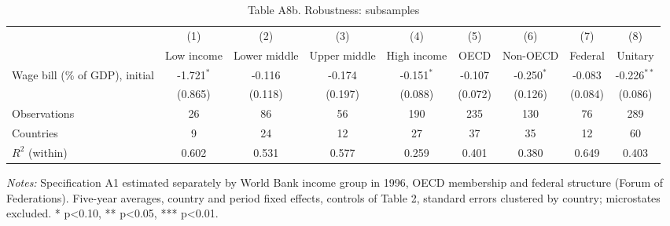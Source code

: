 \begin{table}[htbp]\centering\footnotesize
\providecommand{\sym}[1]{\ensuremath{^{#1}}}
\caption{Table A8b. Robustness: subsamples}\label{tab:TableA8b_robustness_subsamples}
\begin{tabular}{l*{8}{c}}
\toprule
 & (1) & (2) & (3) & (4) & (5) & (6) & (7) & (8) \\
 & Low income & Lower middle & Upper middle & High income & OECD & Non-OECD & Federal & Unitary \\
\midrule
Wage bill (\% of GDP), initial & -1.721\sym{*} & -0.116 & -0.174 & -0.151\sym{*} & -0.107 & -0.250\sym{*} & -0.083 & -0.226\sym{**} \\
 & (0.865) & (0.118) & (0.197) & (0.088) & (0.072) & (0.126) & (0.084) & (0.086) \\
\midrule
Observations & 26 & 86 & 56 & 190 & 235 & 130 & 76 & 289 \\
Countries & 9 & 24 & 12 & 27 & 37 & 35 & 12 & 60 \\
$R^2$ (within) & 0.602 & 0.531 & 0.577 & 0.259 & 0.401 & 0.380 & 0.649 & 0.403 \\
\bottomrule
\end{tabular}
\begin{minipage}{0.95\linewidth}\vspace{4pt}\scriptsize \textit{Notes:} Specification A1 estimated separately by World Bank income group in 1996, OECD membership and federal structure (Forum of Federations). Five-year averages, country and period fixed effects, controls of Table 2, standard errors clustered by country; microstates excluded. * p<0.10, ** p<0.05, *** p<0.01.\end{minipage}
\end{table}
